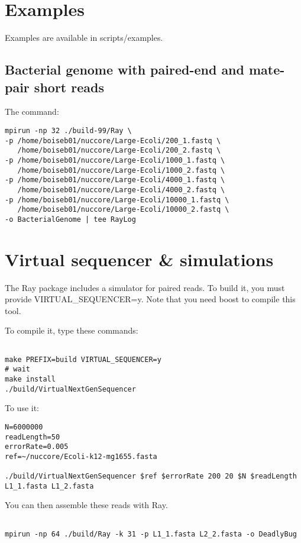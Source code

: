 \documentclass{article}
\begin{document}
\section{Examples}

Examples are available in scripts/examples.

\subsection{Bacterial genome with paired-end and mate-pair short reads}

The command:

\begin{verbatim}
mpirun -np 32 ./build-99/Ray \
-p /home/boiseb01/nuccore/Large-Ecoli/200_1.fastq \
   /home/boiseb01/nuccore/Large-Ecoli/200_2.fastq \
-p /home/boiseb01/nuccore/Large-Ecoli/1000_1.fastq \
   /home/boiseb01/nuccore/Large-Ecoli/1000_2.fastq \
-p /home/boiseb01/nuccore/Large-Ecoli/4000_1.fastq \
   /home/boiseb01/nuccore/Large-Ecoli/4000_2.fastq \
-p /home/boiseb01/nuccore/Large-Ecoli/10000_1.fastq \
   /home/boiseb01/nuccore/Large-Ecoli/10000_2.fastq \
-o BacterialGenome | tee RayLog
\end{verbatim}

\section{Virtual sequencer \& simulations}

The Ray package includes a simulator for paired reads.
To build it, you must provide VIRTUAL\_SEQUENCER=y.
Note that you need boost to compile this tool.

To compile it, type these commands:

\begin{verbatim}

make PREFIX=build VIRTUAL_SEQUENCER=y
# wait
make install
./build/VirtualNextGenSequencer 
\end{verbatim}

To use it:

\begin{verbatim}
N=6000000
readLength=50
errorRate=0.005
ref=~/nuccore/Ecoli-k12-mg1655.fasta

./build/VirtualNextGenSequencer $ref $errorRate 200 20 $N $readLength L1_1.fasta L1_2.fasta
\end{verbatim}

You can then assemble these reads with Ray.

\begin{verbatim}

mpirun -np 64 ./build/Ray -k 31 -p L1_1.fasta L2_2.fasta -o DeadlyBug

\end{verbatim}
\end{document}
